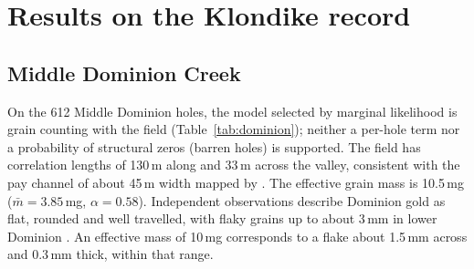 \documentclass[11pt,a4paper]{article}
\theoremstyle{remark}
\newcommand{\mbar}{\bar m}
\begin{document}
\section{Results on the Klondike record}\label{sec:results}

\subsection{Middle Dominion Creek}\label{sec:dominion}

On the 612 Middle Dominion holes, the model selected by marginal likelihood is grain counting with the field (Table~\ref{tab:dominion}); neither a per-hole term nor a probability of structural zeros (barren holes) is supported. The field has correlation lengths of 130\,m along and 33\,m across the valley, consistent with the pay channel of about 45\,m width mapped by \citet{vanLoon2016}. The effective grain mass is 10.5\,mg ($\mbar = 3.85$\,mg, $\alpha = 0.58$). Independent observations describe Dominion gold as flat, rounded and well travelled, with flaky grains up to about 3\,mm in lower Dominion \citep{Froese2001,Chapman2010}. An effective mass of 10\,mg corresponds to a flake about 1.5\,mm across and 0.3\,mm thick, within that range.
\end{document}
